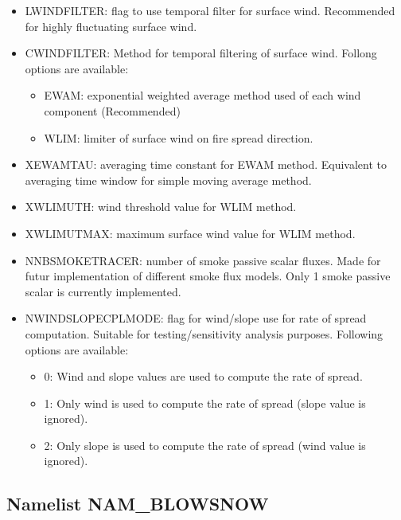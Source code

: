 \begin{itemize}
	\item
	LWINDFILTER: flag to use temporal filter for surface wind. Recommended for highly fluctuating surface wind.
	\item
	CWINDFILTER: Method for temporal filtering of surface wind. Follong options are available:
	\begin{itemize}
		\item EWAM: exponential weighted average method used of each wind component (Recommended)
		\item WLIM: limiter of surface wind on fire spread direction. 
	\end{itemize}
	\item
	XEWAMTAU: averaging time constant for EWAM method. Equivalent to averaging time window for simple moving average method.
	\item
	XWLIMUTH: wind threshold value for WLIM method.
	\item
	XWLIMUTMAX: maximum surface wind value for WLIM method. 
	\item
	NNBSMOKETRACER: number of smoke passive scalar fluxes. Made for futur implementation of different smoke flux models. Only 1 smoke passive scalar is currently implemented.
	\item
	NWINDSLOPECPLMODE: flag for wind/slope use for rate of spread computation. Suitable for testing/sensitivity analysis purposes. Following options are available:
	\begin{itemize}
		\item 0: Wind and slope values are used to compute the rate of spread.
		\item 1: Only wind is used to compute the rate of spread (slope value is ignored).
		\item 2: Only slope is used to compute the rate of spread (wind value is ignored).
	\end{itemize}
\end{itemize}

\subsection{Namelist NAM\_BLOWSNOW }

